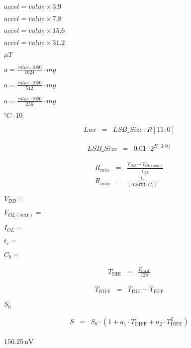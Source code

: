 \documentclass{article}
\begin{document}
$ accel = {value \times 3.9} $
\pagebreak

$ accel = {value \times 7.8} $
\pagebreak

$ accel = {value \times 15.6} $
\pagebreak

$ accel = {value \times 31.2} $
\pagebreak

$\mu T$
\pagebreak

$ a = \frac{value \cdot 1000}{1024} \cdot mg $
\pagebreak

$ a = \frac{value \cdot 1000}{512} \cdot mg $
\pagebreak

$ a = \frac{value \cdot 1000}{256} \cdot mg $
\pagebreak

$^\circ C \cdot 10$
\pagebreak

\begin{eqnarray*} Lux &=& LSB\_Size \cdot R[11:0] \end{eqnarray*}
\pagebreak

\begin{eqnarray*} LSB\_Size &=& 0.01 \cdot 2^{E[3:0]} \end{eqnarray*}
\pagebreak

\begin{eqnarray*} R_{min} &=& \frac{V_{DD} - V_{OL(max)}} {I_{OL}}\\ R_{max} &=& \frac{t_r} {(0.8473 \cdot C_b)} \end{eqnarray*}
\pagebreak

$ V_{DD} =$
\pagebreak

$ V_{OL(max)} =$
\pagebreak

$ I_{OL} =$
\pagebreak

$ t_r =$
\pagebreak

$ C_b =$
\pagebreak

\begin{eqnarray*} T_{\mathrm{DIE}} &=& \frac{T_{\mathrm{RAW}}}{128} \end{eqnarray*}
\pagebreak

\begin{eqnarray*} T_{\mathrm{DIFF}} &=& T_{\mathrm{DIE}} - T_{\mathrm{REF}} \end{eqnarray*}
\pagebreak

$S_{\mathrm{0}}$
\pagebreak

\begin{eqnarray*} S &=& S_{\mathrm{0}} \cdot ( 1 + a_1 \cdot T_{\mathrm{DIFF}} + a_2 \cdot T_{\mathrm{DIFF}}^2 ) \\ \end{eqnarray*}
\pagebreak

$ 156.25\,\mathrm{nV} $
\pagebreak
\end{document}
